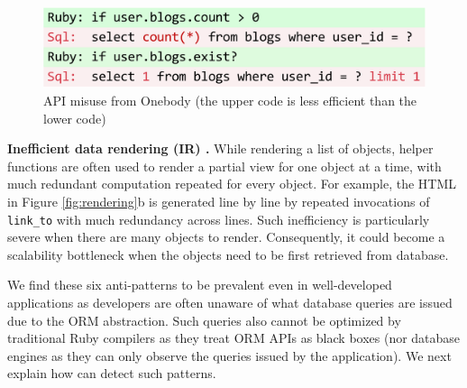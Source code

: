 \begin{figure}
\centering
\includegraphics[width=0.6\columnwidth]{figs/api.pdf}
  
\caption{API misuse from Onebody \textmd{(the upper code is less efficient than the lower code)} %
}
 
\label{fig:spreeAny}
\vspace{-0.2in}
\end{figure}

\textbf{Inefficient data rendering (IR) \cite{junwen:icse2018}.} While rendering a list of objects, helper
functions are often used to render a partial view for one object at a time, with much redundant
computation repeated for every object. For example, the HTML in 
Figure \ref{fig:rendering}b is generated line by line by repeated invocations of {\tt link\_to}
with much redundancy across lines. Such inefficiency is particularly severe when there are 
many objects to render. Consequently, it could become a scalability bottleneck when
the objects need to be first retrieved from database. 

We find these six anti-patterns to be prevalent even in well-developed applications as 
developers are often unaware of what database
queries are issued due to the ORM abstraction. Such queries also cannot be
optimized by traditional Ruby compilers as they treat ORM APIs as
black boxes (nor database engines as they can only observe the queries issued by the application). We next explain how \Tool can detect such patterns.



